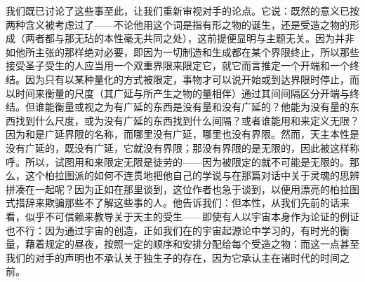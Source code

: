 我们既已讨论了这些事至此，让我们重新审视对手的论点。它说：既然的意义已按两种含义被考虑过了——不论他用这个词是指有形之物的诞生，还是受造之物的形成（两者都与那无玷的本性毫无共同之处），这前提便显明与主题无关。因为并非如他所主张的那样绝对必要，即因为一切制造和生成都在某个界限终止，所以那些接受圣子受生的人应当用一个双重界限来限定它，就它而言推定一个开端和一个终结。因为只有以某种量化的方式被限定，事物才可以说开始或到达界限时停止，而以时间来衡量的尺度（其广延与所产生之物的量相伴）通过其间间隔区分开端与终结。但谁能衡量或视之为有广延的东西是没有量和没有广延的？他能为没有量的东西找到什么尺度，或为没有广延的东西找到什么间隔？或者谁能用和来定义无限？因为和是广延界限的名称，而哪里没有广延，哪里也没有界限。然而，天主本性是没有广延的，既没有广延，它就没有界限；那没有界限的是无限的，因此被这样称呼。所以，试图用和来限定无限是徒劳的——因为被限定的就不可能是无限的。那么，这个柏拉图派的如何不连贯地把他自己的学说与在那篇对话中关于灵魂的思辨拼凑在一起呢？因为正如在那里谈到，这位作者也急于谈到，以便用漂亮的柏拉图式措辞来欺骗那些不了解这些事的人。他告诉我们：但本性，从我们先前的话来看，似乎不可信赖来教导关于天主的受生——即使有人以宇宙本身作为论证的例证也不行：因为通过宇宙的创造，正如我们在的宇宙起源论中学习的，有时光的衡量，藉着规定的昼夜，按照一定的顺序和安排分配给每个受造之物：而这一点甚至我们的对手的声明也不承认关于独生子的存在，因为它承认主在诸时代的时间之前。\par


